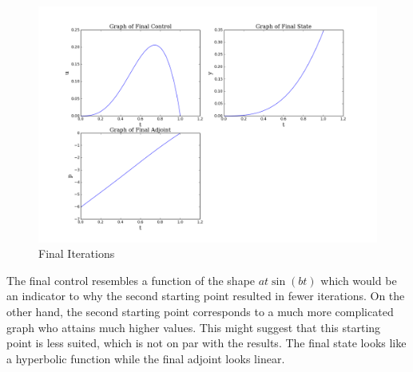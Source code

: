 \documentclass{article}
\begin{document}
\begin{figure}[H]
\centering
  \includegraphics[scale=0.3]{u.png}
\caption{Final Iterations}
\label{final}
\end{figure}
The final control resembles a function of the shape $at \sin(bt)$ which would be an indicator
to why the second starting point resulted in fewer iterations. On the other hand, the second starting point corresponds
to a much more complicated graph who attains much higher values. This might suggest that this starting point is less suited, which is not on par with the results. The final state looks like
a hyperbolic function while the final adjoint looks linear.
\end{document}
